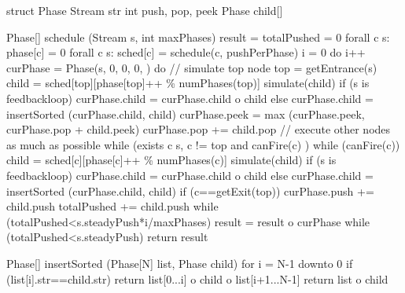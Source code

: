 struct Phase {
  Stream str
  int push, pop, peek
  Phase child[]
}

Phase[] schedule (Stream s, int maxPhases) {
  result = {}
  totalPushed = 0
  forall c \in s:  phase[c] = 0
  forall c \in s:  sched[c] = schedule(c, pushPerPhase)
  i = 0
  do {
    i++
    curPhase = Phase(s, 0, 0, 0, {})
    do {
      // simulate top node
      top = getEntrance(s)
      child = sched[top][phase[top]++ \% numPhases(top)]
      simulate(child)
      if (s is feedbackloop)
        curPhase.child = curPhase.child o child
      else 
        curPhase.child = insertSorted (curPhase.child, child)
      curPhase.peek = max (curPhase.peek, curPhase.pop + child.peek)
      curPhase.pop += child.pop
      // execute other nodes as much as possible
      while (exists c \in s, c != top and canFire(c) ) {
        while (canFire(c)) {
          child = sched[c][phase[c]++ \% numPhases(c)]
          simulate(child)
          if (s is feedbackloop)
            curPhase.child = curPhase.child o child
          else 
            curPhase.child = insertSorted (curPhase.child, child)
          if (c==getExit(top)) {
            curPhase.push += child.push
            totalPushed += child.push
          }
        }
      }
    } while (totalPushed<s.steadyPush*i/maxPhases)
    result = result o curPhase
  } while (totalPushed<s.steadyPush)
  return result
}

Phase[] insertSorted (Phase[N] list, Phase child) {
  for i = N-1 downto 0
    if (list[i].str==child.str)
      return list[0...i] o child o list[i+1...N-1]
  return list o child
}
